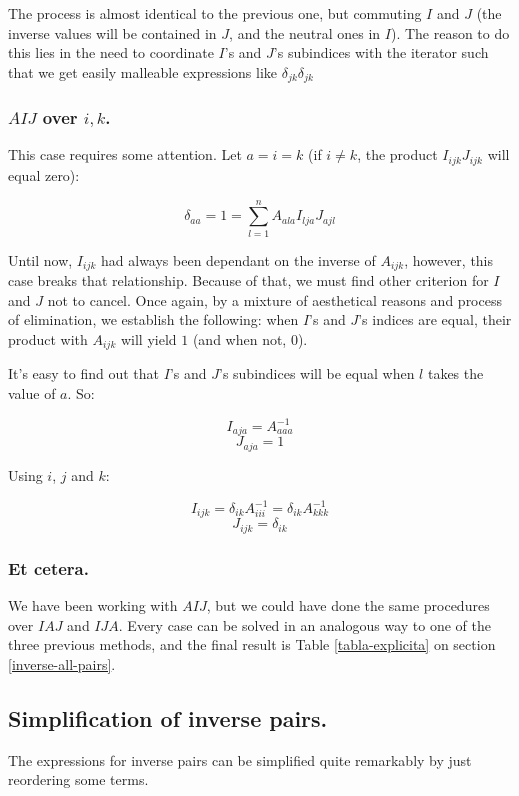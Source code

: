 The process is almost identical to the previous one, but commuting $I$ and $J$ (the inverse values will be contained in $J$, and the neutral ones in $I$). The reason to do this lies in the need to coordinate $I$'s and $J$'s subindices with the iterator such that we get easily malleable expressions like $\delta_{jk} \delta_{jk}$

\subsubsection{$AIJ$ over $i, k$.}

This case requires some attention. Let $a = i = k$ (if $i \neq k$, the product $I_{ijk} J_{ijk}$ will equal zero):

$$\delta_{aa} = 1 = \sum\limits_{l = 1}^{n} A_{ala} I_{lja} J_{ajl}$$

Until now, $I_{ijk}$ had always been dependant on the inverse of $A_{ijk}$, however, this case breaks that relationship. Because of that, we must find other criterion for $I$ and $J$ not to cancel. Once again, by a mixture of aesthetical reasons and process of elimination, we establish the following: when $I$'s and $J$'s indices are equal, their product with $A_{ijk}$ will yield $1$ (and when not, $0$).

It's easy to find out that $I$'s and $J$'s subindices will be equal when $l$ takes the value of $a$. So:

$$I_{aja} = A_{aaa}^{-1}$$
$$J_{aja} = 1$$

Using $i$, $j$ and $k$:

$$I_{ijk} = \delta_{ik} A_{iii}^{-1} = \delta_{ik} A_{kkk}^{-1}$$
$$J_{ijk} = \delta_{ik}$$

\subsubsection{Et cetera.}

We have been working with $AIJ$, but we could have done the same procedures over $IAJ$ and $IJA$. Every case can be solved in an analogous way to one of the three previous methods, and the final result is Table \ref{tabla-explicita} on section \ref{inverse-all-pairs}.

\subsection{Simplification of inverse pairs.} \label{appendix-4}

The expressions for inverse pairs can be simplified quite remarkably by just reordering some terms.


